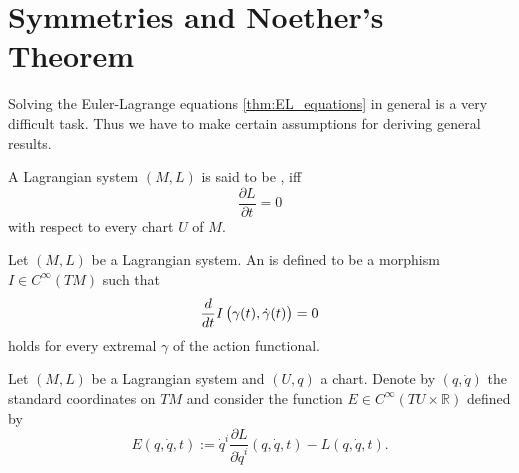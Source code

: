 \section*{Symmetries and Noether's Theorem}
Solving the Euler-Lagrange equations \ref{thm:EL_equations} in general is a very difficult task. Thus we have to make certain assumptions for deriving general results.

\begin{definition}
	A Lagrangian system $(M,L)$ is said to be , iff
	\begin{equation*}
		\frac{\partial L}{\partial t} = 0
	\end{equation*}
	\noindent with respect to every chart $U$ of $M$.
\end{definition}

\begin{definition}
	Let $(M,L)$ be a Lagrangian system. An  is defined to be a morphism $I \in C^\infty(TM)$ such that
	\begin{equation*}
		\frac{d}{dt}I\del[1]{\gamma(t),\dot{\gamma}(t)} = 0
	\end{equation*}
	\noindent holds for every extremal $\gamma$ of the action functional.
\end{definition}

Let $(M,L)$ be a Lagrangian system and $(U,q)$ a chart. Denote by $(q,\dot{q})$ the standard coordinates on $TM$ and consider the function $E \in C^\infty(TU \times \mathbb{R})$ defined by
\begin{equation}
	\label{eq:energy}
	E(q,\dot{q},t) := \dot{q}^i \frac{\partial L}{\partial \dot{q}^i}(q,\dot{q},t) - L(q,\dot{q},t).
\end{equation}

\begin{definition}[Energy]
	
\end{definition}
